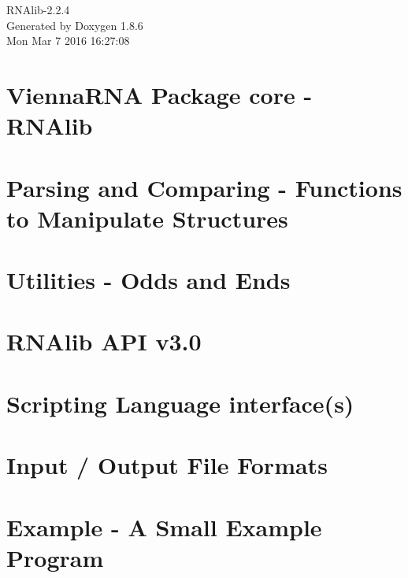 \documentclass[twoside]{book}
\newcommand{\clearemptydoublepage}{%
  \newpage{\pagestyle{empty}\cleardoublepage}%
}
\begin{document}
\hypersetup{pageanchor=false}
\begin{titlepage}
\vspace*{7cm}
\begin{center}%
{\Large R\-N\-Alib-\/2.2.4 }\\
\vspace*{1cm}
{\large Generated by Doxygen 1.8.6}\\
\vspace*{0.5cm}
{\small Mon Mar 7 2016 16:27:08}\\
\end{center}
\end{titlepage}
\clearemptydoublepage
\tableofcontents
\clearemptydoublepage
{}
\hypersetup{pageanchor=true}

\chapter{Vienna\-R\-N\-A Package core -\/ R\-N\-Alib}
\label{index}\hypertarget{index}{}
\chapter{Parsing and Comparing -\/ Functions to Manipulate Structures}
\label{mp_parse}
\hypertarget{mp_parse}{}

\chapter{Utilities -\/ Odds and Ends}
\label{mp_utils}
\hypertarget{mp_utils}{}

\chapter{R\-N\-Alib A\-P\-I v3.0}
\label{newAPI}
\hypertarget{newAPI}{}

\chapter{Scripting Language interface(s)}
\label{swig_interface}
\hypertarget{swig_interface}{}

\chapter{Input / Output File Formats}
\label{file_formats}
\hypertarget{file_formats}{}

\chapter{Example -\/ A Small Example Program}
\label{mp_example}
\hypertarget{mp_example}{}

\end{document}
